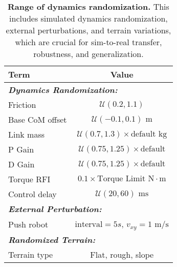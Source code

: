 \begin{table}[ht!]
\caption{\textbf{Range of dynamics randomization.} This includes simulated dynamics randomization, external perturbations, and terrain variations, which are crucial for sim-to-real transfer, robustness, and generalization.}
\label{table:dr}
\centering
\renewcommand{\arraystretch}{1.3} 
\begin{tabular}{l c}
\toprule[0.95pt]
\textbf{Term} & \textbf{Value} \\
\midrule[0.6pt]
\multicolumn{2}{l}{\textit{\textbf{Dynamics Randomization:}}} \\
\midrule[0.6pt]
Friction & $\mathcal{U}(0.2, 1.1)$ \\
Base CoM offset & $\mathcal{U}(-0.1, 0.1) \text{ m}$ \\
Link mass & $\mathcal{U}(0.7, 1.3) \times \text{default} \text{ kg}$ \\
P Gain & $\mathcal{U}(0.75, 1.25) \times \text{default}$ \\
D Gain & $\mathcal{U}(0.75, 1.25) \times \text{default}$ \\
Torque RFI~\cite{MinimalDyamicsRandomization24} & $0.1 \times \text{Torque Limit} \text{ N}\cdot\text{m}$ \\
Control delay & $\mathcal{U}(20, 60) \text{ ms}$ \\
\midrule[0.6pt]
\multicolumn{2}{l}{\textit{\textbf{External Perturbation:}}} \\
\midrule[0.6pt]
Push robot & $\text{interval} = 5s$, $v_{xy} = 1 \text{ m/s}$ \\
\midrule[0.6pt]
\multicolumn{2}{l}{\textit{\textbf{Randomized Terrain:}}} \\
\midrule[0.6pt]
Terrain type & Flat, rough, slope \\
\bottomrule[0.95pt]
\end{tabular}
\end{table}

